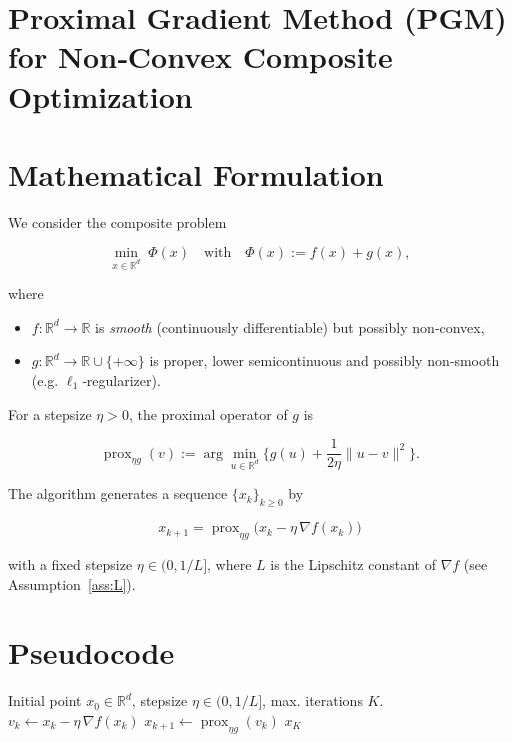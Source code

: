 \documentclass{article}
\newcommand{\prox}{\operatorname{prox}}
\newcommand{\grad}{\nabla}
\newcommand{\R}{\mathbb{R}}
\begin{document}
\section*{Proximal Gradient Method (PGM) for Non‑Convex Composite Optimization}

\section*{Mathematical Formulation}
We consider the composite problem  

\[
\min_{x\in\R^{d}} \; \Phi(x)\quad\text{with}\quad 
\Phi(x):=f(x)+g(x),
\]

where  

\begin{itemize}[nosep]
\item $f:\R^{d}\to\R$ is \emph{smooth} (continuously differentiable) but possibly non‑convex,
\item $g:\R^{d}\to\R\cup\{+\infty\}$ is proper, lower semicontinuous and possibly non‑smooth (e.g. $\ell_{1}$‑regularizer).
\end{itemize}

For a stepsize $\eta>0$, the proximal operator of $g$ is  

\[
\prox_{\eta g}(v):=\arg\min_{u\in\R^{d}}\Big\{ g(u)+\frac{1}{2\eta}\|u-v\|^{2}\Big\}.
\]

The algorithm generates a sequence $\{x_{k}\}_{k\ge0}$ by  

\[
\boxed{\;x_{k+1}= \prox_{\eta g}\bigl(x_{k}-\eta\,\grad f(x_{k})\bigr)\; } \tag{1}
\]

with a fixed stepsize $\eta\in(0,1/L]$, where $L$ is the Lipschitz constant of $\grad f$ (see Assumption~\ref{ass:L}).

\section*{Pseudocode}
\begin{algorithm}[H]
\caption{Proximal Gradient Method (PGM)}
\begin{algorithmic}[1]
\Require Initial point $x_{0}\in\R^{d}$, stepsize $\eta\in(0,1/L]$,
        max. iterations $K$.
    \State $v_{k}\gets x_{k}-\eta\,\grad f(x_{k})$ 
    \State $x_{k+1}\gets \prox_{\eta g}(v_{k})$ 
\EndFor
\State \Return $x_{K}$
\end{algorithmic}
\end{algorithm}
\end{document}
